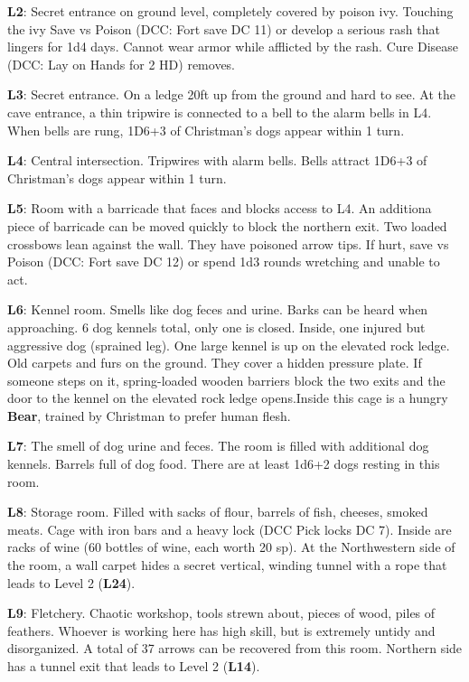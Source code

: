\documentclass[
]{book}
\begin{document}
\textbf{L2}: Secret entrance on ground level, completely covered by poison ivy. Touching the ivy Save vs Poison (DCC: Fort save DC 11) or develop a serious rash that lingers for 1d4 days. Cannot wear armor while afflicted by the rash. Cure Disease (DCC: Lay on Hands for 2 HD) removes.

\textbf{L3}: Secret entrance. On a ledge 20ft up from the ground and hard to see. At the cave entrance, a thin tripwire is connected to a bell to the alarm bells in L4. When bells are rung, 1D6+3 of Christman's dogs appear within 1 turn.

\textbf{L4}: Central intersection. Tripwires with alarm bells. Bells attract 1D6+3 of Christman's dogs appear within 1 turn.

\textbf{L5}: Room with a barricade that faces and blocks access to L4. An additiona piece of barricade can be moved quickly to block the northern exit. Two loaded crossbows lean against the wall. They have poisoned arrow tips. If hurt, save vs Poison (DCC: Fort save DC 12) or spend 1d3 rounds wretching and unable to act.

\textbf{L6}: Kennel room. Smells like dog feces and urine. Barks can be heard when approaching. 6 dog kennels total, only one is closed. Inside, one injured but aggressive dog (sprained leg). One large kennel is up on the elevated rock ledge. Old carpets and furs on the ground. They cover a hidden pressure plate. If someone steps on it, spring-loaded wooden barriers block the two exits and the door to the kennel on the elevated rock ledge opens.Inside this cage is a hungry \textbf{Bear}, trained by Christman to prefer human flesh.

\textbf{L7}: The smell of dog urine and feces. The room is filled with additional dog kennels. Barrels full of dog food. There are at least 1d6+2 dogs resting in this room.

\textbf{L8}: Storage room. Filled with sacks of flour, barrels of fish, cheeses, smoked meats. Cage with iron bars and a heavy lock (DCC Pick locks DC 7). Inside are racks of wine (60 bottles of wine, each worth 20 sp). At the Northwestern side of the room, a wall carpet hides a secret vertical, winding tunnel with a rope that leads to Level 2 (\textbf{L24}).

\textbf{L9}: Fletchery. Chaotic workshop, tools strewn about, pieces of wood, piles of feathers. Whoever is working here has high skill, but is extremely untidy and disorganized. A total of 37 arrows can be recovered from this room. Northern side has a tunnel exit that leads to Level 2 (\textbf{L14}).
\end{document}
